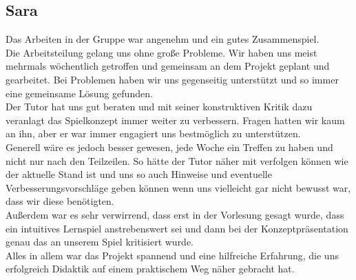 \documentclass[10pt,a4paper,notitlepage]{report}
\begin{document}
	\subsection{Sara}
	Das Arbeiten in der Gruppe war angenehm und ein gutes Zusammenspiel.\\
	Die Arbeitsteilung gelang uns ohne große Probleme. Wir haben uns meist mehrmals wöchentlich getroffen und gemeinsam an dem Projekt geplant und gearbeitet. Bei Problemen haben wir uns gegenseitig unterstützt und so immer eine gemeinsame Lösung gefunden.\\
	Der Tutor hat uns gut beraten und mit seiner konstruktiven Kritik dazu veranlagt das Spielkonzept immer weiter zu verbessern. Fragen hatten wir kaum an ihn, aber er war immer engagiert uns bestmöglich zu unterstützen.\\
	Generell wäre es jedoch besser gewesen, jede Woche ein Treffen zu haben und nicht nur nach den Teilzeilen. So hätte der Tutor näher mit verfolgen können wie der aktuelle Stand ist und uns so auch Hinweise und eventuelle Verbesserungsvorschläge geben können wenn uns vielleicht gar nicht bewusst war, dass wir diese benötigten.\\
	Außerdem war es sehr verwirrend, dass erst in der Vorlesung gesagt wurde, dass ein intuitives Lernspiel anstrebenswert sei und dann bei der Konzeptpräsentation genau das an unserem Spiel kritisiert wurde.\\
	Alles in allem war das Projekt spannend und eine hilfreiche Erfahrung, die uns erfolgreich Didaktik auf einem praktischem Weg näher gebracht hat.\\
\end{document}
